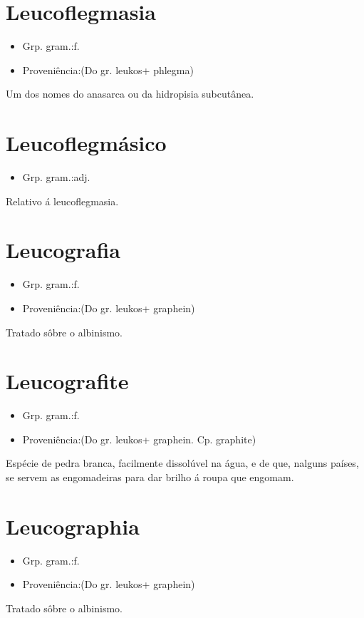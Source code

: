 \section{Leucoflegmasia}
\begin{itemize}
\item {Grp. gram.:f.}
\end{itemize}
\begin{itemize}
\item {Proveniência:(Do gr. \textunderscore leukos\textunderscore  + \textunderscore phlegma\textunderscore )}
\end{itemize}
Um dos nomes do anasarca ou da hidropisia subcutânea.
\section{Leucoflegmásico}
\begin{itemize}
\item {Grp. gram.:adj.}
\end{itemize}
Relativo á leucoflegmasia.
\section{Leucografia}
\begin{itemize}
\item {Grp. gram.:f.}
\end{itemize}
\begin{itemize}
\item {Proveniência:(Do gr. \textunderscore leukos\textunderscore  + \textunderscore graphein\textunderscore )}
\end{itemize}
Tratado sôbre o albinismo.
\section{Leucografite}
\begin{itemize}
\item {Grp. gram.:f.}
\end{itemize}
\begin{itemize}
\item {Proveniência:(Do gr. \textunderscore leukos\textunderscore  + \textunderscore graphein\textunderscore . Cp. \textunderscore graphite\textunderscore )}
\end{itemize}
Espécie de pedra branca, facilmente dissolúvel na água, e de que, nalguns países, se servem as engomadeiras para dar brilho á roupa que engomam.
\section{Leucographia}
\begin{itemize}
\item {Grp. gram.:f.}
\end{itemize}
\begin{itemize}
\item {Proveniência:(Do gr. \textunderscore leukos\textunderscore  + \textunderscore graphein\textunderscore )}
\end{itemize}
Tratado sôbre o albinismo.
